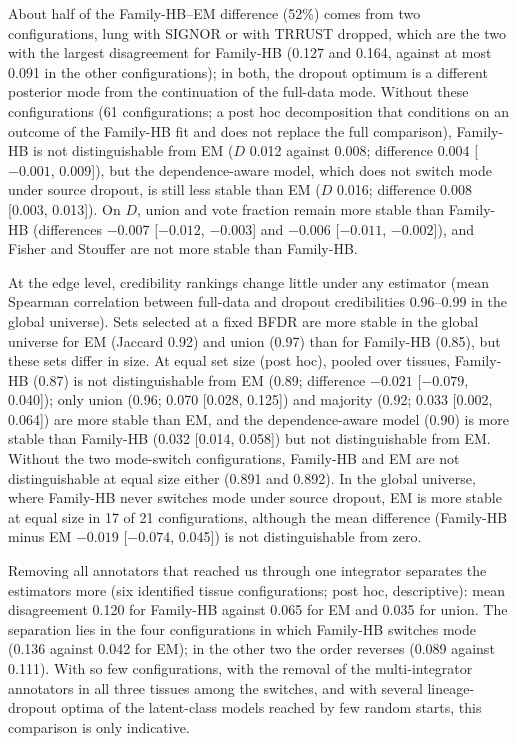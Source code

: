 \documentclass[11pt,a4paper]{article}
\begin{document}
About half of the Family-HB--EM difference (52\%) comes from two configurations, lung with SIGNOR or with TRRUST dropped, which are the two with the largest disagreement for Family-HB (0.127 and 0.164, against at most 0.091 in the other configurations); in both, the dropout optimum is a different posterior mode from the continuation of the full-data mode.
Without these configurations (61 configurations; a post hoc decomposition that conditions on an outcome of the Family-HB fit and does not replace the full comparison), Family-HB is not distinguishable from EM ($D$ 0.012 against 0.008; difference 0.004 [\ensuremath{-0.001}, 0.009]), but the dependence-aware model, which does not switch mode under source dropout, is still less stable than EM ($D$ 0.016; difference 0.008 [0.003, 0.013]).
On $D$, union and vote fraction remain more stable than Family-HB (differences \ensuremath{-0.007} [\ensuremath{-0.012}, \ensuremath{-0.003}] and \ensuremath{-0.006} [\ensuremath{-0.011}, \ensuremath{-0.002}]), and Fisher and Stouffer are not more stable than Family-HB.

At the edge level, credibility rankings change little under any estimator (mean Spearman correlation between full-data and dropout credibilities 0.96--0.99 in the global universe).
Sets selected at a fixed BFDR are more stable in the global universe for EM (Jaccard 0.92) and union (0.97) than for Family-HB (0.85), but these sets differ in size.
At equal set size (post hoc), pooled over tissues, Family-HB (0.87) is not distinguishable from EM (0.89; difference \ensuremath{-0.021} [\ensuremath{-0.079}, 0.040]); only union (0.96; 0.070 [0.028, 0.125]) and majority (0.92; 0.033 [0.002, 0.064]) are more stable than EM, and the dependence-aware model (0.90) is more stable than Family-HB (0.032 [0.014, 0.058]) but not distinguishable from EM.
Without the two mode-switch configurations, Family-HB and EM are not distinguishable at equal size either (0.891 and 0.892).
In the global universe, where Family-HB never switches mode under source dropout, EM is more stable at equal size in 17 of 21 configurations, although the mean difference (Family-HB minus EM \ensuremath{-0.019} [\ensuremath{-0.074}, 0.045]) is not distinguishable from zero.

Removing all annotators that reached us through one integrator separates the estimators more (six identified tissue configurations; post hoc, descriptive): mean disagreement 0.120 for Family-HB against 0.065 for EM and 0.035 for union.
The separation lies in the four configurations in which Family-HB switches mode (0.136 against 0.042 for EM); in the other two the order reverses (0.089 against 0.111).
With so few configurations, with the removal of the multi-integrator annotators in all three tissues among the switches, and with several lineage-dropout optima of the latent-class models reached by few random starts, this comparison is only indicative.
\end{document}
